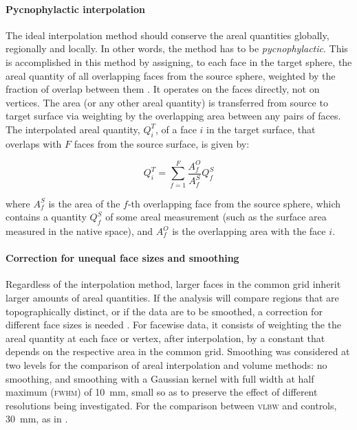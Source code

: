 \paragraph{Pycnophylactic interpolation}

The ideal interpolation method should conserve the areal quantities globally, regionally and locally. In other words, the method has to be \emph{pycnophylactic}. This is accomplished in this method by assigning, to each face in the target sphere, the areal quantity of all overlapping faces from the source sphere, weighted by the fraction of overlap between them \citep{Markoff1973, Winkler2012}. It operates on the faces directly, not on vertices. The area (or any other areal quantity) is transferred from source to target surface via weighting by the overlapping area between any pairs of faces. The interpolated areal quantity, $Q^{T}_{i}$, of a face $i$ in the target surface, that overlaps with $F$ faces from the source surface, is given by:

$$
Q^{T}_{i} = \sum_{f=1}^{F} \frac{A^{O}_{f}}{A^{S}_{f}} Q^{S}_{f}
$$

\noindent
where $A^{S}_{f}$ is the area of the $f$-th overlapping face from the source sphere, which contains a quantity $Q^{S}_{f}$ of some areal measurement (such as the surface area measured in the native space), and $A^{O}_{f}$ is the overlapping area with the face $i$.

\paragraph{Correction for unequal face sizes and smoothing}

Regardless of the interpolation method, larger faces in the common grid inherit larger amounts of areal quantities. If the analysis will compare regions that are topographically distinct, or if the data are to be smoothed, a correction for different face sizes is needed \citep{Winkler2012}. For facewise data, it consists of weighting the the areal quantity at each face or vertex, after interpolation, by a constant that depends on the respective area in the common grid. Smoothing was considered at two levels for the comparison of areal interpolation and volume methods: no smoothing, and smoothing with a Gaussian kernel with full width at half maximum (\textsc{fwhm}) of 10~mm, small so as to preserve the effect of different resolutions being investigated. For the comparison between \textsc{vlbw} and controls, 30~mm, as in \citet{Skranes2013}.

